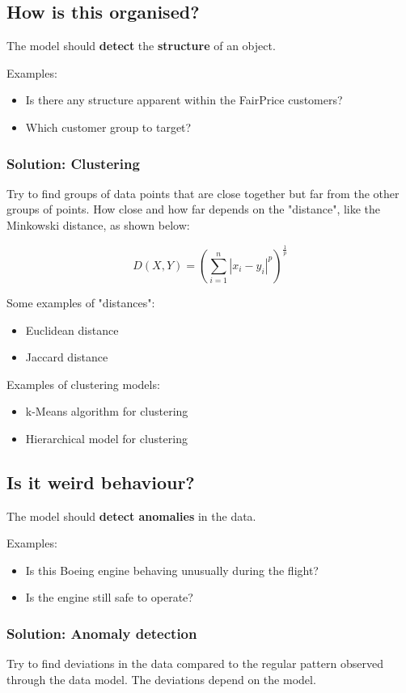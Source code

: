 \documentclass[11pt]{article}
\begin{document}
\subsection{How is this organised?}
\label{sec:org566e946}
The model should \textbf{detect} the \textbf{structure} of an object.

Examples:
\begin{itemize}
\item Is there any structure apparent within the FairPrice customers?
\item Which customer group to target?
\end{itemize}
\subsubsection{Solution: Clustering}
\label{sec:orgcf6c580}
Try to find groups of data points that are close together but far from the other groups of points. How close and how far depends on the "distance", like the Minkowski distance, as shown below:

\[D(X, Y) = \left(\sum_{i = 1}^n \left| x_i - y_i \right|^p \right)^{\frac{1}{p}}\]

Some examples of "distances":
\begin{itemize}
\item Euclidean distance
\item Jaccard distance
\end{itemize}

Examples of clustering models:
\begin{itemize}
\item k-Means algorithm for clustering
\item Hierarchical model for clustering
\end{itemize}
\subsection{Is it weird behaviour?}
\label{sec:org1e6612a}
The model should \textbf{detect anomalies} in the data.

Examples:
\begin{itemize}
\item Is this Boeing engine behaving unusually during the flight?
\item Is the engine still safe to operate?
\end{itemize}
\subsubsection{Solution: Anomaly detection}
\label{sec:orgc2f5a59}
Try to find deviations in the data compared to the regular pattern observed through the data model. The deviations depend on the model.
\end{document}

